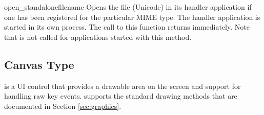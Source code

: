 \begin{methoddesc}{open_standalone}{filename}
Opens the file  (Unicode) in its handler 
application if one has been registered for the particular MIME type. The 
handler application is started in its own process. The call to this function 
returns immediately. Note that  is not called for 
applications started with this method.
\end{methoddesc}

\subsection{Canvas Type}
\label{subsec:canvas}
 is a UI control that provides a drawable area on the screen 
and support for handling raw key events.  supports the 
standard drawing methods that are documented in Section \ref{sec:graphics}.

